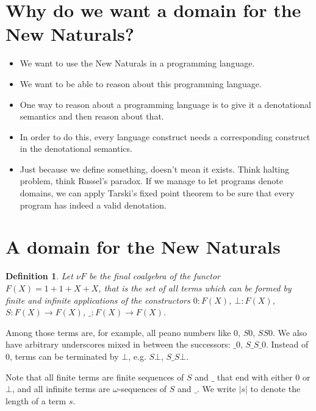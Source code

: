 \documentclass[a4paper]{article}
\newcommand{\arr}{\rightarrow}
\newtheorem{defNuF}{Definition}[section]
\begin{document}
\section{Why do we want a domain for the New Naturals?}

\begin{itemize}

\item We want to use the New Naturals in a programming language.

\item We want to be able to reason about this programming language.

\item One way to reason about a programming language is to give it a
denotational semantics and then reason about that.

\item In order to do this, every language construct needs a corresponding
construct in the denotational semantics.

\item Just because we define something, doesn't mean it exists.  Think halting
problem, think Russel's paradox. If we manage to let programs denote domains,
we can apply Tarski's fixed point theorem to be sure that every program has
indeed a valid denotation.

\end{itemize}

\section{A domain for the New Naturals}

\begin{defNuF}

Let $\nu F$ be the final coalgebra of the functor $F(X) = 1 + 1 + X + X$, that
is the set of all terms which can be formed by finite and infinite applications
of the constructors $0:F(X)$, $\bot:F(X)$, $S:F(X) \arr F(X)$, $\_:F(X) \arr
F(X)$.

\end{defNuF}


Among those terms are, for example, all peano numbers like $0$, $S0$, $SS0$.
We also have arbitrary underscores mixed in between the successors: $\_0$,
$S\_S\_0$.  Instead of $0$, terms can be terminated by $\bot$, e.g.  $S\bot$,
$S\_S\bot$.

Note that all finite terms are finite sequences of $S$ and $\_$
that end with either $0$ or $\bot$, and all infinite terms are
$\omega$-sequences of $S$ and $\_$.  We write $|s|$ to denote the length of a
term $s$.
\end{document}

